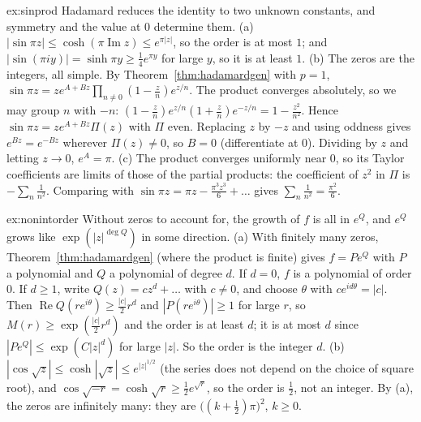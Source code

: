 \begin{solution}{ex:sinprod}
\idea Hadamard reduces the identity to two unknown constants, and symmetry and the value at $0$ determine them.
\writeup (a) $|\sin\pi z|\le\cosh(\pi\operatorname{Im}z)\le e^{\pi|z|}$, so the order is at most $1$; and $|\sin(\pi iy)|=\sinh\pi y\ge\frac14e^{\pi y}$ for large $y$, so it is at least $1$. (b) The zeros are the integers, all simple.
By Theorem~\ref{thm:hadamardgen} with $p=1$, $\sin\pi z=ze^{A+Bz}\prod_{n\ne0}(1-\frac zn)e^{z/n}$. The product converges absolutely, so we may group $n$ with $-n$: $(1-\frac zn)e^{z/n}(1+\frac zn)e^{-z/n}=1-\frac{z^2}{n^2}$. Hence
$\sin\pi z=ze^{A+Bz}\Pi(z)$ with $\Pi$ even. Replacing $z$ by $-z$ and using oddness gives $e^{Bz}=e^{-Bz}$ wherever $\Pi(z)\ne0$, so $B=0$ (differentiate at $0$). Dividing by $z$ and letting $z\to0$, $e^A=\pi$.
(c) The product converges uniformly near $0$, so its Taylor coefficients are limits of those of the partial products: the coefficient of $z^2$ in $\Pi$ is $-\sum_n\frac1{n^2}$. Comparing with
$\sin\pi z=\pi z-\frac{\pi^3z^3}6+\dots$ gives $\sum_n\frac1{n^2}=\frac{\pi^2}6$.
\end{solution}

\begin{solution}{ex:nonintorder}
\idea Without zeros to account for, the growth of $f$ is all in $e^Q$, and $e^{Q}$ grows like $\exp(|z|^{\deg Q})$ in some direction.
\writeup (a) With finitely many zeros, Theorem~\ref{thm:hadamardgen} (where the product is finite) gives $f=Pe^Q$ with $P$ a polynomial and $Q$ a polynomial of degree $d$. If $d=0$, $f$ is a polynomial of order
$0$. If $d\ge1$, write $Q(z)=cz^d+\dots$ with $c\ne0$, and choose $\theta$ with $ce^{id\theta}=|c|$. Then $\operatorname{Re}Q(re^{i\theta})\ge\frac{|c|}2r^d$ and $|P(re^{i\theta})|\ge1$ for large $r$, so $M(r)\ge\exp(\frac{|c|}2r^d)$ and the order is
at least $d$; it is at most $d$ since $|Pe^Q|\le\exp(C|z|^d)$ for large $|z|$. So the order is the integer $d$. (b) $|\cos\sqrt z|\le\cosh|\sqrt z|\le e^{|z|^{1/2}}$ (the series does not depend on the choice of
square root), and $\cos\sqrt{-r}=\cosh\sqrt r\ge\frac12e^{\sqrt r}$, so the order is $\frac12$, not an integer. By (a), the zeros are infinitely many: they are $\bigl((k+\frac12)\pi\bigr)^2$, $k\ge0$.
\end{solution}

